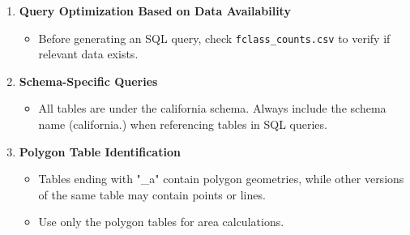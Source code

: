 \documentclass{article}
\begin{document}
{\begin{enumerate}
    \item \textbf{Query Optimization Based on Data Availability}
    \begin{itemize}
        \item Before generating an SQL query, check \texttt{fclass\_counts.csv} to verify if relevant data exists.
    \end{itemize}

    \item \textbf{Schema-Specific Queries}
    \begin{itemize}
        \item All tables are under the california schema. Always include the schema name (california.) when referencing tables in SQL queries.
    \end{itemize}

    \item \textbf{Polygon Table Identification}
    \begin{itemize}
        \item Tables ending with "\_a" contain polygon geometries, while other versions of the same table may contain points or lines.
        \item Use only the polygon tables for area calculations.
    \end{itemize}
\end{enumerate}
}
\end{document}
